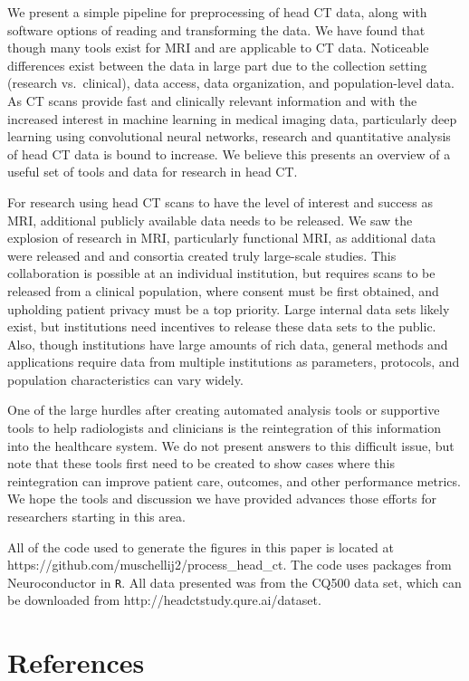 \documentclass[]{elsarticle} %
\begin{document}
We present a simple pipeline for preprocessing of head CT data, along with software options of reading and transforming the data. We have found that though many tools exist for MRI and are applicable to CT data. Noticeable differences exist between the data in large part due to the collection setting (research vs.~clinical), data access, data organization, and population-level data. As CT scans provide fast and clinically relevant information and with the increased interest in machine learning in medical imaging data, particularly deep learning using convolutional neural networks, research and quantitative analysis of head CT data is bound to increase. We believe this presents an overview of a useful set of tools and data for research in head CT.

For research using head CT scans to have the level of interest and success as MRI, additional publicly available data needs to be released. We saw the explosion of research in MRI, particularly functional MRI, as additional data were released and and consortia created truly large-scale studies. This collaboration is possible at an individual institution, but requires scans to be released from a clinical population, where consent must be first obtained, and upholding patient privacy must be a top priority. Large internal data sets likely exist, but institutions need incentives to release these data sets to the public. Also, though institutions have large amounts of rich data, general methods and applications require data from multiple institutions as parameters, protocols, and population characteristics can vary widely.

One of the large hurdles after creating automated analysis tools or supportive tools to help radiologists and clinicians is the reintegration of this information into the healthcare system. We do not present answers to this difficult issue, but note that these tools first need to be created to show cases where this reintegration can improve patient care, outcomes, and other performance metrics. We hope the tools and discussion we have provided advances those efforts for researchers starting in this area.

All of the code used to generate the figures in this paper is located at https://github.com/muschellij2/process\_head\_ct. The code uses packages from Neuroconductor in \texttt{R}. All data presented was from the CQ500 data set, which can be downloaded from http://headctstudy.qure.ai/dataset.

\hypertarget{references}{%
\section*{References}\label{references}}
\end{document}
